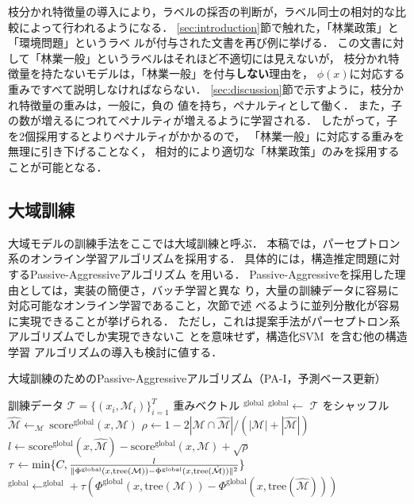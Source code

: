 \documentclass[japanese]{jnlp_1.4}
\newcommand{\vect}[1]{}
\def\argmax{}
\begin{document}
枝分かれ特徴量の導入により，ラベルの採否の判断が，ラベル同士の相対的な比
較によって行われるようになる．
\ref{sec:introduction}節で触れた，「林業政策」と「環境問題」というラベ
ルが付与された文書を再び例に挙げる．
この文書に対して「林業一般」というラベルはそれほど不適切には見えないが，
枝分かれ特徴量を持たないモデルは，「林業一般」を付与{\bf しない}理由を，
$\phi(x)$に対応する重みですべて説明しなければならない．
\ref{sec:discussion}節で示すように，枝分かれ特徴量の重みは，一般に，負の
値を持ち，ペナルティとして働く．
また，子の数が増えるにつれてペナルティが増えるように学習される．
したがって，子を2個採用するとよりペナルティがかかるので，
「林業一般」に対応する重みを無理に引き下げることなく，
相対的により適切な「林業政策」のみを採用することが可能となる．


\subsection{大域訓練}

大域モデルの訓練手法をここでは大域訓練と呼ぶ．
本稿では，パーセプトロン系のオンライン学習アルゴリズムを採用する．
具体的には，構造推定問題に対するPassive-Aggressiveアルゴリズム
\cite{Crammer2006}を用いる．
Passive-Aggressiveを採用した理由としては，実装の簡便さ，バッチ学習と異な
り，大量の訓練データに容易に対応可能なオンライン学習であること，次節で述
べるように並列分散化が容易に実現できることが挙げられる．
ただし，これは提案手法がパーセプトロン系アルゴリズムでしか実現できないこ
とを意味せず，構造化SVM~\cite{Tsochantaridis:ICML2004}を含む他の構造学習
アルゴリズムの導入も検討に値する．

\begin{algorithm}[t]
\caption{
大域訓練のためのPassive-Aggressiveアルゴリズム（PA-I，予測ベース更新）}
\label{alg:pa-global}
\DeclarePairedDelimiter\norm{\lVert}{\rVert}
\renewcommand{\algorithmicrequire}{}
\renewcommand{\algorithmicensure}{}
\setlength{\baselineskip}{11pt}
\begin{algorithmic}[1]
\REQUIRE 訓練データ $\mathcal{T} = \{ ( x_i, \mathcal{M}_i ) \}_{i=1}^T$
\ENSURE 重みベクトル $\vect{w}^{\mathrm{global}}$
\STATE $\vect{w}^{\mathrm{global}} \leftarrow \vect{0}$
  \STATE $\mathcal{T}$ をシャッフル
    \STATE $\hat{\mathcal{M}} \leftarrow \argmax_{\mathcal{M}} \, \mathrm{score}^{\mathrm{global}}(x, \mathcal{M}) $
    \STATE $\rho \leftarrow 1 - 2 |\mathcal{M} \cap \hat{\mathcal{M}}| / (|\mathcal{M}| + |\hat{\mathcal{M}}|)$
        \STATE $l \leftarrow \mathrm{score}^{\mathrm{global}}(x, \hat{\mathcal{M}}) - \mathrm{score}^{\mathrm{global}}(x, \mathcal{M}) + \sqrt{\rho}$
        \STATE $\tau \leftarrow \min \{ C, \frac{l}{\norm{\Phi^{\mathrm{global}} (x, \mathrm{tree}(\mathcal{M})) - \Phi^{\mathrm{global}} (x, \mathrm{tree}(\hat{\mathcal{M}}))}^2} \}$
        \STATE $\vect{w}^{\mathrm{global}} \leftarrow \vect{w}^{\mathrm{global}} + \tau (\Phi^{\mathrm{global}} (x, \mathrm{tree}(\mathcal{M})) - \Phi^{\mathrm{global}} (x, \mathrm{tree}(\hat{\mathcal{M}})))$
    \ENDIF
  \ENDFOR
\ENDFOR
\end{algorithmic}
\end{algorithm}
\end{document}
